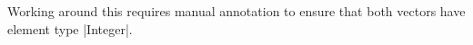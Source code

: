 \noindent
Working around this requires manual annotation to ensure that both
vectors have element type \scheme|Integer|.



